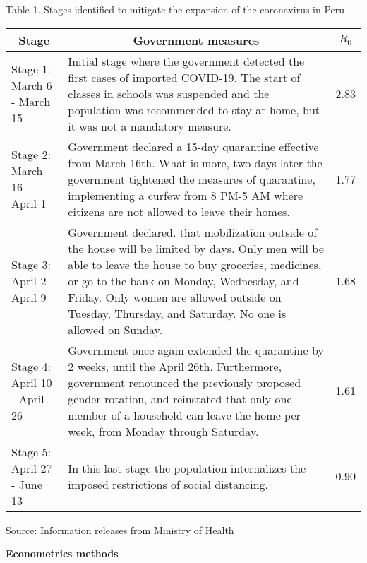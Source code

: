 \documentclass[12pt]{article}
\begin{document}
\begin{flushleft}
\centering Table 1. Stages identified to mitigate the expansion of the coronavirus in Peru \end{flushleft}

\begin{table}[h!]
\centering
\begin{tabular}{ | m{4cm} | m{10cm}| m{1cm} | }
\hline
\multicolumn{1}{|c|}{Stage} & \multicolumn{1}{|c|}{Government measures} & \multicolumn{1}{|c|}{$R_0$} \\ [0.5ex] 
\hline\hline
Stage 1: March 6 - March 15 & 
Initial stage where the government detected the first cases of imported COVID-19.
The start of classes in schools was suspended and the population was recommended to stay at home, but it was not a mandatory measure. & \multicolumn{1}{|c|}{2.83} \\ 
Stage 2: March 16 - April 1 & Government declared a 15-day quarantine effective from March 16th. What is more, two days later the government tightened the measures of quarantine, implementing a curfew from 8 PM-5 AM where citizens are not allowed to leave their homes.  & \multicolumn{1}{|c|}{1.77} \\
Stage 3: April 2 - April 9  & Government declared. that mobilization outside of the house will be limited by days. Only men will be able to leave the house to buy groceries, medicines, or go to the bank on Monday, Wednesday, and Friday. Only women are allowed outside on Tuesday, Thursday, and Saturday. No one is allowed on Sunday.
 & \multicolumn{1}{|c|}{1.68} \\
Stage 4: April 10 - April 26  & Government once again extended the quarantine by 2 weeks, until the April 26th. Furthermore, government renounced the previously proposed gender rotation, and reinstated that only one member of a household can leave the home per week, from Monday through Saturday. & \multicolumn{1}{|c|}{1.61} \\
Stage 5: April 27 - June 13  & In this last stage the population internalizes the imposed restrictions of social distancing. & \multicolumn{1}{|c|}{0.90} \\ [1ex] 
\hline
\end{tabular}
\end{table}
Source: Information releases from Ministry of Health
\clearpage

\begin{flushleft}
\textbf{Econometrics methods}
\end{flushleft}
\end{document}
